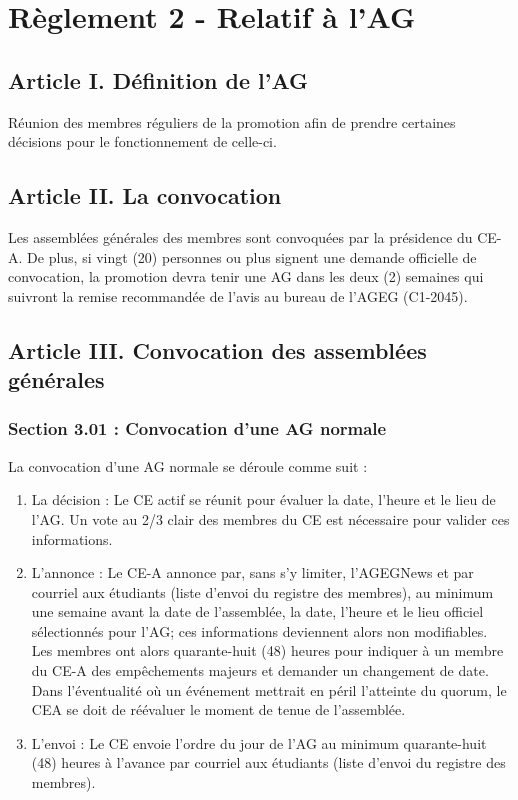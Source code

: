\section*{Règlement 2 - Relatif à l'AG} 

\subsection*{Article I. Définition de l'AG}
Réunion des membres réguliers de la promotion afin de prendre certaines décisions pour le fonctionnement de celle-ci. 

\subsection*{Article II. La convocation}
Les assemblées générales des membres sont convoquées par la présidence du CE-A. De plus, si vingt (20) personnes ou plus signent une demande officielle de convocation, la promotion devra tenir une AG dans les deux (2) semaines qui suivront la remise recommandée de l’avis au bureau de l’AGEG (C1-2045).

\subsection*{Article III. Convocation des assemblées générales}

\subsubsection*{Section 3.01 : Convocation d'une AG normale}
La convocation d’une AG normale se déroule comme suit :
\begin{enumerate}
\item La décision : Le CE actif se réunit pour évaluer la date, l’heure et le lieu de l’AG. Un vote au 2/3 clair des membres du CE est nécessaire pour valider ces informations.
\item L’annonce : Le CE-A annonce par, sans s’y limiter, l’AGEGNews et par courriel aux étudiants (liste d’envoi du registre des membres), au minimum une semaine avant la date de l’assemblée, la date, l’heure et le lieu officiel sélectionnés pour l’AG; ces informations deviennent alors non modifiables. Les membres ont alors quarante-huit (48) heures pour indiquer à un membre du CE-A des empêchements majeurs et demander un changement de date. Dans l’éventualité où un événement mettrait en péril l’atteinte du quorum, le CEA se doit de réévaluer le moment de tenue de l’assemblée.
\item L’envoi : Le CE envoie l’ordre du jour de l’AG au minimum quarante-huit (48) heures à l’avance par courriel aux étudiants (liste d’envoi du registre des membres).
\end{enumerate}

